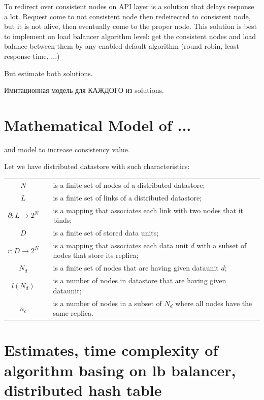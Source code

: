 \documentclass{report}
\begin{document}
To redirect over consistent nodes on API layer is a solution that delays response a lot.
Request come to not consistent node then redeirected to consistent node, but it is not alive,
then eventually come to the proper node. This solution is best to implement on load balancer algorithm level: get the consistent nodes and load balance between them by any enabled default  algorithm (round robin, least response time, ...)

But estimate both solutions.

Имитационная модель для КАЖДОГО из solutions.

\chapter{Mathematical Model of ... }
and model  to increase consistency value.


Let we have distributed datastore with such characteristics:
\begin{tabular*}{\textwidth}{cp{0.5cm}p{}}
$N$&& is a finite set of nodes of a distributed datastore; \\
$L$&& is a finite set of links of a distributed datastore; \\
$\partial:L\rightarrow 2^N$&& is a mapping that associates each link with two nodes that it binds;\\
$D$&& is a finite set of stored data units;\\
$r:D\rightarrow 2^N$&& is a mapping that associates each data unit $d$ with a subset of nodes 
that store its replica; \\

$N_d$&& is a finite set of nodes that are having given dataunit $d$; \\
$l(N_d)$&& is a number of nodes in datastore that are having given dataunit; \\
$n_c$&& is a number of nodes in a subset of $N_d$ where all nodes have the same replica.
\end{tabular*}
\chapter{Estimates, time complexity of algorithm basing on lb balancer, distributed hash table}
\end{document}
